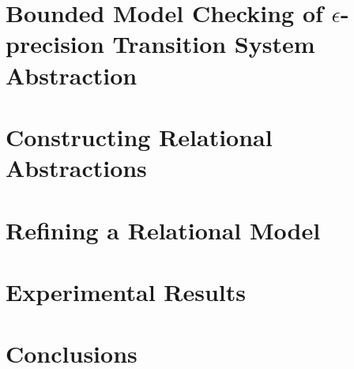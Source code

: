 \documentclass[9pt,sigconf]{acmart}
\begin{document}
\section{Bounded Model Checking of $\epsilon$-precision Transition System Abstraction}
\label{sec:bmc}


\section{Constructing Relational Abstractions}


\section{Refining a Relational Model}
\label{sec:rel-mod}







\section{Experimental Results}
\label{sec:res}



\section{Conclusions}
\label{sec:concl}





% 
\end{document}
